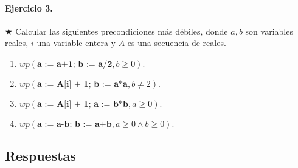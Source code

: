 \documentclass{article}
\begin{document}
\paragraph{Ejercicio 3.} $\bigstar$ Calcular las siguientes precondiciones más débiles, donde 
$a, b$ son variables reales, $i$ una variable entera y $A$
es una secuencia de reales.

\begin{enumerate}[label=\alph*)]
\item $wp(\textbf{a := a+1; b := a/2}, b \geq 0).$
\item $wp(\textbf{a := A[i] + 1; b := a*a}, b\neq 2).$
\item $wp(\textbf{a := A[i] + 1; a := b*b}, a \geq 0).$
\item $wp(\textbf{a := a-b; b := a+b}, a \geq 0 \wedge b \geq 0).$
\end{enumerate}

\subsection*{Respuestas}
\end{document}
